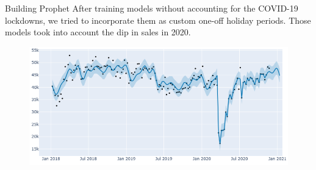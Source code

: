 \documentclass[9pt, dvipsnames]{beamer}
\begin{document}
    \begin{frame}{Building Prophet}
        After training models without accounting for the COVID-19 lockdowns, we tried to incorporate them as 
        custom one-off holiday periods. Those models took into account the dip in sales in 2020.
        \begin{figure}
            \centering
            \includegraphics[height=0.47\paperheight]{assets/Prophet-Weekly.png}
            \label{fig:Prophet-Weekly}
        \end{figure}
    \end{frame}
\end{document}

